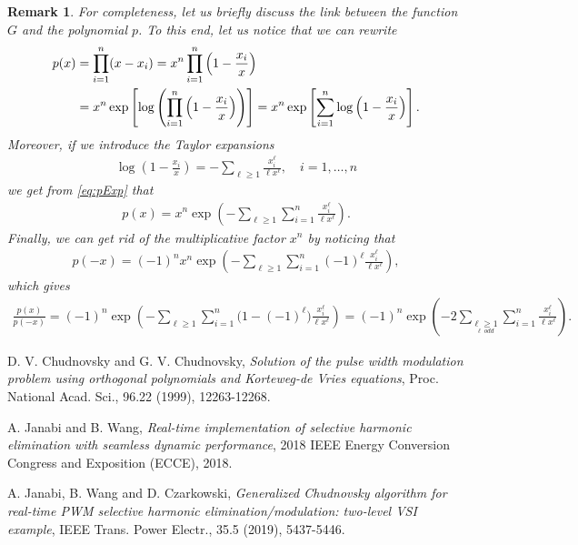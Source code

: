 \documentclass[a4paper]{article}
\numberwithin{equation}{section}
\newtheorem{remark}{Remark}
\begin{document}
{\begin{remark}
\em{
For completeness, let us briefly discuss the link between the function $G$ and the polynomial $p$. To this end, let us notice that we can rewrite
\begin{align}\label{eq:pExp}
	p(x) &= \prod_{i=1}^n (x-x_i) = x^n\prod_{i=1}^n \left(1-\frac{x_i}{x}\right) \notag
	\\
	&= x^n\exp\left[\log\left(\prod_{i=1}^n \left(1-\frac{x_i}{x}\right)\right)\right] = x^n\exp\left[\sum_{i=1}^n\log\left(1-\frac{x_i}{x}\right)\right].
\end{align}
Moreover, if we introduce the Taylor expansions
\begin{align*}
	\log\left(1-\frac{x_i}{x}\right) = -\sum_{\ell\geq 1} \frac{x_i^\ell}{\ell x^\ell}, \quad i = 1,\ldots,n
\end{align*}
we get from \eqref{eq:pExp} that
\begin{align*}
	p(x) = x^n\exp\left(- \sum_{\ell\geq 1}\sum_{i=1}^n \frac{x_i^\ell}{\ell x^\ell}\right). 
\end{align*}
Finally, we can get rid of the multiplicative factor $x^n$ by noticing that
\begin{align*}
	p(-x) = (-1)^n x^n\exp\left(- \sum_{\ell\geq 1}\sum_{i=1}^n (-1)^\ell\frac{x_i^\ell}{\ell x^\ell}\right),
\end{align*}
which gives
\begin{align}\label{eq:pExpansionFrac}
	\frac{p(x)}{p(-x)} = (-1)^n\exp\left(- \sum_{\ell\geq 1}\sum_{i=1}^n \big(1-(-1)^\ell\big)\frac{x_i^\ell}{\ell x^\ell}\right) = (-1)^n\exp\left(-2\sum_{\underset{\ell\; odd}{\ell\geq 1}}\sum_{i=1}^n \frac{x_i^\ell}{\ell x^\ell}\right).
\end{align}
}
\end{remark}
}

\begin{thebibliography}{99}
	 D. V. Chudnovsky and G. V. Chudnovsky, \textit{Solution of the pulse width modulation problem using orthogonal polynomials and Korteweg-de Vries equations}, Proc. National Acad. Sci., 96.22 (1999), 12263-12268.
	
	 A. Janabi and B. Wang, \textit{Real-time implementation of selective harmonic elimination with seamless dynamic performance}, 2018 IEEE Energy Conversion Congress and Exposition (ECCE), 2018.
	
	 A. Janabi, B. Wang and D. Czarkowski, \textit{Generalized Chudnovsky algorithm for real-time PWM selective harmonic elimination/modulation: two-level VSI example}, IEEE Trans. Power Electr., 35.5 (2019), 5437-5446.
\end{thebibliography}
\end{document}

